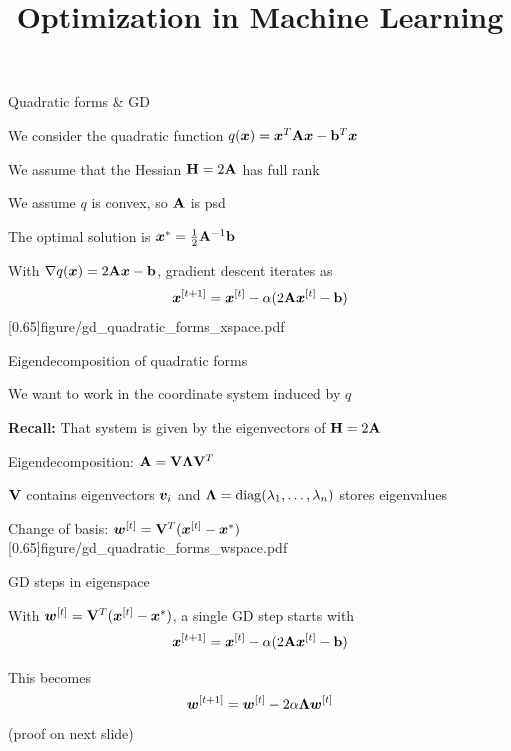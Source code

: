 \documentclass[11pt,compress,t,notes=noshow, xcolor=table]{beamer}
\title{Optimization in Machine Learning}
\begin{document}


\begin{framei}[align=top]{Quadratic forms \& GD}
\item We consider the quadratic function $q(\bm{x}) = \bm{x}^T \mathbf{A} \bm{x} - \mathbf{b}^T \bm{x}$
\item We assume that the Hessian $\mathbf{H} = 2 \mathbf{A}$ has full rank
\item We assume $q$ is convex, so $\mathbf{A}$ is psd
\item The optimal solution is $\bm{x}^\ast = \frac{1}{2} \mathbf{A}^{-1} \mathbf{b}$
\item With $\nabla q(\bm{x}) = 2 \mathbf{A} \bm{x} - \mathbf{b}$, gradient descent iterates as
$$
\bm{x}^{[t+1]} = \bm{x}^{[t]} - \alpha (2 \mathbf{A} \bm{x}^{[t]} - \mathbf{b})
$$
\imageFixed{4.5cm}{5cm}[0.65]{figure/gd_quadratic_forms_xspace.pdf}
\end{framei}


\begin{framei}[align=top]{Eigendecomposition of quadratic forms}
\item We want to work in the coordinate system induced by $q$
\item \textbf{Recall:} That system is given by the eigenvectors of $\mathbf{H} = 2\mathbf{A}$
\item Eigendecomposition: $\mathbf{A} = \mathbf{V} \bm{\Lambda} \mathbf{V}^T$
\item $\mathbf{V}$ contains eigenvectors $\bm{v}_i$ and $\bm{\Lambda} = \operatorname{diag}(\lambda_1, \dots, \lambda_n)$ stores eigenvalues
\item Change of basis: $\bm{w}^{[t]} = \mathbf{V}^T (\bm{x}^{[t]} - \bm{x}^\ast)$
\imageFixed{4.5cm}{5cm}[0.65]{figure/gd_quadratic_forms_wspace.pdf}
\end{framei}


\begin{framei}{GD steps in eigenspace}
\item With $\bm{w}^{[t]} = \mathbf{V}^T (\bm{x}^{[t]} - \bm{x}^\ast)$, a single GD step starts with
$$
\bm{x}^{[t+1]} = \bm{x}^{[t]} - \alpha (2 \mathbf{A} \bm{x}^{[t]} - \mathbf{b})
$$
\item This becomes
$$
\bm{w}^{[t+1]} = \bm{w}^{[t]} - 2 \alpha \bm{\Lambda} \bm{w}^{[t]}
$$
(proof on next slide)
\end{framei}
\end{document}
